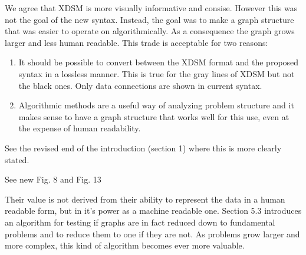 \documentclass{aiaa-tc}
\begin{document}

We agree that XDSM is more visually informative and consise. However this was not the 
goal of the new syntax. Instead, the goal was to make a graph structure that 
was easier to operate on algorithmically. As a consequence the graph grows larger and 
less human readable. This trade is acceptable for two reasons: 

\begin{enumerate}
    \item It should be possible to convert between the XDSM format and the proposed syntax 
    in a lossless manner. This is true for the gray lines of XDSM but not the black ones.
    Only data connections are shown in current syntax. 
    \item Algorithmic methods are a useful way of analyzing problem structure and it makes 
    sense to have a graph structure that works well for this use, even at the expense 
    of human readability. 
\end{enumerate}

See the revised end of the introduction (section 1) where this is more clearly stated. 


See new Fig. 8 and Fig. 13 



Their value is not derived from their ability to represent the data in a human readable 
form, but in it's power as a machine readable one. Section 5.3 introduces an 
algorithm for testing if graphs are in fact reduced down to fundamental problems and 
to reduce them to one if they are not. As problems grow larger and more complex, 
this kind of algorithm becomes ever more valuable. 
\end{document}
